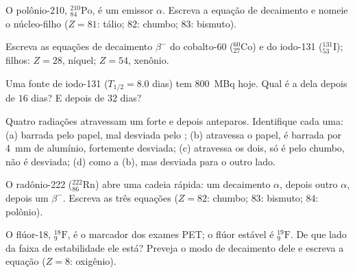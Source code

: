 \begin{exercise}[$\star$]\label{exo:g11:nucleus-radioactivity:3}
O polônio-210, ${}^{210}_{84}\mathrm{Po}$, é um emissor $\alpha$. Escreva
a equação de decaimento e nomeie o núcleo-filho ($Z = 81$: tálio; $82$:
chumbo; $83$: bismuto).
\end{exercise}

\begin{exercise}[$\star$]\label{exo:g11:nucleus-radioactivity:4}
Escreva as equações de decaimento $\beta^-$ do cobalto-60
(${}^{60}_{27}\mathrm{Co}$) e do iodo-131 (${}^{131}_{53}\mathrm{I}$);
filhos: $Z = 28$, níquel; $Z = 54$, xenônio.
\end{exercise}

\begin{exercise}[$\star$]\label{exo:g11:nucleus-radioactivity:5}
Uma fonte de iodo-131 ($T_{1/2} = 8.0$ dias) tem  \qty{800}{MBq}
hoje. Qual é a  dela depois de $16$ dias? E depois de $32$ dias?
\end{exercise}

\begin{exercise}[$\star\star$]\label{exo:g11:nucleus-radioactivity:6}
Quatro radiações atravessam um  forte e depois anteparos.
Identifique cada uma: (a) barrada pelo papel, mal desviada pelo ;
(b) atravessa o papel, é barrada por \qty{4}{mm} de alumínio, fortemente
desviada; (c) atravessa os dois, só é  pelo chumbo, não é
desviada; (d) como a (b), mas desviada para o outro lado.
\end{exercise}

\begin{exercise}[$\star\star$]\label{exo:g11:nucleus-radioactivity:7}
O radônio-222 (${}^{222}_{86}\mathrm{Rn}$) abre uma cadeia rápida: um
decaimento $\alpha$, depois outro $\alpha$, depois um $\beta^-$. Escreva
as três equações ($Z = 82$: chumbo; $83$: bismuto; $84$: polônio).
\end{exercise}

\begin{exercise}[$\star\star$]\label{exo:g11:nucleus-radioactivity:8}
O flúor-18, ${}^{18}_{9}\mathrm{F}$, é o marcador dos exames PET; o flúor
estável é ${}^{19}_{9}\mathrm{F}$. De que lado da faixa de estabilidade
ele está? Preveja o modo de decaimento dele e escreva a equação ($Z = 8$:
oxigênio).
\end{exercise}

